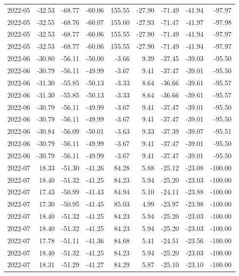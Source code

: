 \begin{table}[ht]
\begin{tabular}{lrrrrrrrr}
  2022-05 & -32.53 & -68.77 & -60.06 & 155.55 & -27.90 & -71.49 & -41.94 & -97.97 \\ 
  2022-05 & -32.55 & -68.76 & -60.07 & 155.60 & -27.93 & -71.47 & -41.97 & -97.98 \\ 
  2022-05 & -32.53 & -68.77 & -60.06 & 155.55 & -27.90 & -71.49 & -41.94 & -97.97 \\ 
  2022-05 & -32.53 & -68.77 & -60.06 & 155.55 & -27.90 & -71.49 & -41.94 & -97.97 \\ 
  2022-06 & -30.80 & -56.11 & -50.00 & -3.66 & 9.39 & -37.45 & -39.03 & -95.50 \\ 
  2022-06 & -30.79 & -56.11 & -49.99 & -3.67 & 9.41 & -37.47 & -39.01 & -95.50 \\ 
  2022-06 & -31.30 & -55.85 & -50.13 & -3.33 & 8.64 & -36.66 & -39.61 & -95.57 \\ 
  2022-06 & -31.30 & -55.85 & -50.13 & -3.33 & 8.64 & -36.66 & -39.61 & -95.57 \\ 
  2022-06 & -30.79 & -56.11 & -49.99 & -3.67 & 9.41 & -37.47 & -39.01 & -95.50 \\ 
  2022-06 & -30.79 & -56.11 & -49.99 & -3.67 & 9.41 & -37.47 & -39.01 & -95.50 \\ 
  2022-06 & -30.84 & -56.09 & -50.01 & -3.63 & 9.33 & -37.39 & -39.07 & -95.51 \\ 
  2022-06 & -30.79 & -56.11 & -49.99 & -3.67 & 9.41 & -37.47 & -39.01 & -95.50 \\ 
  2022-06 & -30.79 & -56.11 & -49.99 & -3.67 & 9.41 & -37.47 & -39.01 & -95.50 \\ 
  2022-07 & 18.33 & -51.30 & -41.26 & 84.28 & 5.88 & -25.12 & -23.08 & -100.00 \\ 
  2022-07 & 18.40 & -51.32 & -41.25 & 84.23 & 5.94 & -25.20 & -23.03 & -100.00 \\ 
  2022-07 & 17.43 & -50.99 & -41.43 & 84.94 & 5.10 & -24.11 & -23.88 & -100.00 \\ 
  2022-07 & 17.30 & -50.95 & -41.45 & 85.03 & 4.99 & -23.97 & -23.98 & -100.00 \\ 
  2022-07 & 18.40 & -51.32 & -41.25 & 84.23 & 5.94 & -25.20 & -23.03 & -100.00 \\ 
  2022-07 & 18.40 & -51.32 & -41.25 & 84.23 & 5.94 & -25.20 & -23.03 & -100.00 \\ 
  2022-07 & 17.78 & -51.11 & -41.36 & 84.68 & 5.41 & -24.51 & -23.56 & -100.00 \\ 
  2022-07 & 18.40 & -51.32 & -41.25 & 84.23 & 5.94 & -25.20 & -23.03 & -100.00 \\ 
  2022-07 & 18.31 & -51.29 & -41.27 & 84.29 & 5.87 & -25.10 & -23.10 & -100.00 \\ 

\end{tabular}
\end{table}
